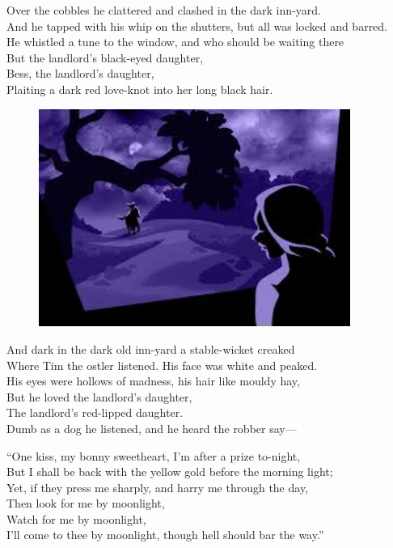 \documentclass[oneside,12pt,english]{book}
\begin{document}
Over the cobbles he clattered and clashed in the dark inn-yard.\\
And he tapped with his whip on the shutters, but all was locked and barred.\\
He whistled a tune to the window, and who should be waiting there\\
But the landlord’s black-eyed daughter,\\
Bess, the landlord’s daughter,\\
Plaiting a dark red love-knot into her long black hair.

\begin{figure}[H]
\centering
\includegraphics[height=2.8in]{fig-02.jpg}
\end{figure}


And dark in the dark old inn-yard a stable-wicket creaked\\
Where Tim the ostler listened. His face was white and peaked.\\
His eyes were hollows of madness, his hair like mouldy hay,\\
But he loved the landlord’s daughter,\\
The landlord’s red-lipped daughter.\\
Dumb as a dog he listened, and he heard the robber say---


``One kiss, my bonny sweetheart, I’m after a prize to-night,\\
But I shall be back with the yellow gold before the morning light;\\
Yet, if they press me sharply, and harry me through the day,\\
Then look for me by moonlight,\\
Watch for me by moonlight,\\
I’ll come to thee by moonlight, though hell should bar the way.''
\end{document}
